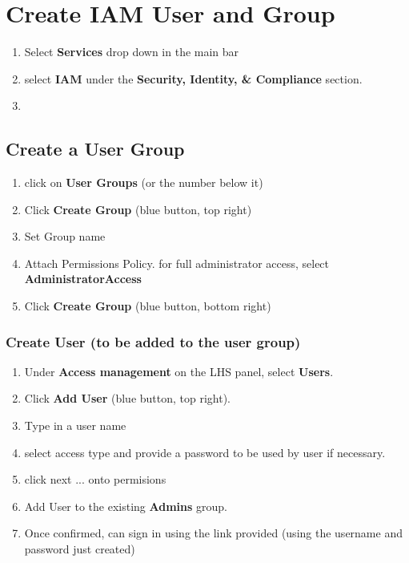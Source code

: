 \documentclass[11pt]{article}
\begin{document}
    \section{Create IAM User and Group}
    \begin{enumerate}
        \item Select \textbf{Services} drop down in the main bar
        \item select \textbf{IAM} under the \textbf{Security, Identity, \& Compliance} section.
        \item
    \end{enumerate}
    \subsection{Create a User Group}
    \begin{enumerate}
        \item click on \textbf{User Groups} (or the number below it)
        \item Click \textbf{Create Group}
        \subitem (blue button, top right)
        \item Set Group name
        \item Attach Permissions Policy.
        \subitem for full administrator access, select \textbf{AdministratorAccess}
        \item Click \textbf{Create Group}
        \subitem (blue button, bottom right)
    \end{enumerate}
    \subsubsection{Create User (to be added to the user group)}
    \begin{enumerate}
        \item Under \textbf{Access management} on the LHS panel, select \textbf{Users}.
        \item Click \textbf{Add User} (blue button, top right).
        \item Type in a user name
        \item select access type and provide a password to be used by user if necessary.
        \item click next
        \subitem ... onto permisions
        \item Add User to the existing \textbf{Admins} group.
        \item Once confirmed, can sign in using the link provided (using the username and password just created)
    \end{enumerate}
\end{document}

